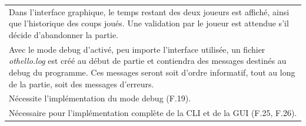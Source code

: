 \documentclass[a4paper,12pt]{article}
\begin{document}
\begin{tabularx}{\textwidth}{|X|}
    Dans l’interface graphique, le temps restant des deux joueurs est affiché, ainsi que l’historique des coups joués. Une validation par le joueur est attendue s'il décide d’abandonner la partie.                                                                                                                                                                                                                       \\
    Avec le mode debug d’activé, peu importe l’interface utilisée, un fichier \textit{othello.log} est créé au début de partie et contiendra des messages destinés au debug du programme. Ces messages seront soit d’ordre informatif, tout au long de la partie, soit des messages d’erreurs.                                                                                                                             \\
    \hline
    Nécessite l’implémentation du mode debug (F.19).                                                                                                                                                                                                                                                                                                                                                                       \\
    Nécessaire pour l’implémentation complète de la CLI et de la GUI (F.25, F.26).                                                                                                                                                                                                                                                                                                                                         \\
    \hline
\end{tabularx}

\vspace{1cm}
\end{document}
